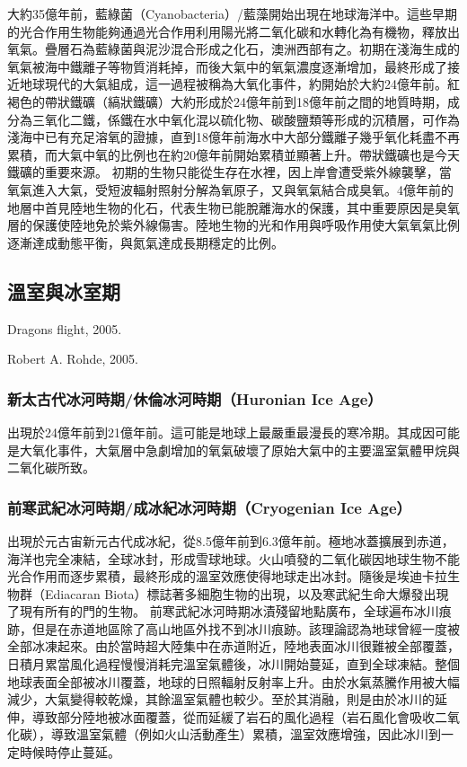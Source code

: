 \documentclass[a4paper,12pt]{report}
\begin{document}
大約35億年前，藍綠菌（Cyanobacteria）/藍藻開始出現在地球海洋中。這些早期的光合作用生物能夠通過光合作用利用陽光將二氧化碳和水轉化為有機物，釋放出氧氣。疊層石為藍綠菌與泥沙混合形成之化石，澳洲西部有之。初期在淺海生成的氧氣被海中鐵離子等物質消耗掉，而後大氣中的氧氣濃度逐漸增加，最終形成了接近地球現代的大氣組成，這一過程被稱為大氧化事件，約開始於大約24億年前。紅褐色的帶狀鐵礦（縞狀鐵礦）大約形成於24億年前到18億年前之間的地質時期，成分為三氧化二鐵，係鐵在水中氧化混以硫化物、碳酸鹽類等形成的沉積層，可作為淺海中已有充足溶氧的證據，直到18億年前海水中大部分鐵離子幾乎氧化耗盡不再累積，而大氣中氧的比例也在約20億年前開始累積並顯著上升。帶狀鐵礦也是今天鐵礦的重要來源。
初期的生物只能從生存在水裡，因上岸會遭受紫外線襲擊，當氧氣進入大氣，受短波輻射照射分解為氧原子，又與氧氣結合成臭氧。4億年前的地層中首見陸地生物的化石，代表生物已能脫離海水的保護，其中重要原因是臭氧層的保護使陸地免於紫外線傷害。陸地生物的光和作用與呼吸作用使大氣氧氣比例逐漸達成動態平衡，與氮氣達成長期穩定的比例。
\subsection{溫室與冰室期}
\bct\bfH\ctr{}\caption{Dragons flight, 2005.}\ef\FB\ect\bct\bfH\ctr{}\caption{Robert A. Rohde, 2005.}\ef\FB\ect
\subsubsection{新太古代冰河時期/休倫冰河時期（Huronian Ice Age）}
出現於24億年前到21億年前。這可能是地球上最嚴重最漫長的寒冷期。其成因可能是大氧化事件，大氣層中急劇增加的氧氣破壞了原始大氣中的主要溫室氣體甲烷與二氧化碳所致。
\subsubsection{前寒武紀冰河時期/成冰紀冰河時期（Cryogenian Ice Age）}
出現於元古宙新元古代成冰紀，從8.5億年前到6.3億年前。極地冰蓋擴展到赤道，海洋也完全凍結，全球冰封，形成雪球地球。火山噴發的二氧化碳因地球生物不能光合作用而逐步累積，最終形成的溫室效應使得地球走出冰封。隨後是埃迪卡拉生物群（Ediacaran Biota）標誌著多細胞生物的出現，以及寒武紀生命大爆發出現了現有所有的門的生物。
前寒武紀冰河時期冰漬殘留地點廣布，全球遍布冰川痕跡，但是在赤道地區除了高山地區外找不到冰川痕跡。該理論認為地球曾經一度被全部冰凍起來。由於當時超大陸集中在赤道附近，陸地表面冰川很難被全部覆蓋，日積月累當風化過程慢慢消耗完溫室氣體後，冰川開始蔓延，直到全球凍結。整個地球表面全部被冰川覆蓋，地球的日照輻射反射率上升。由於水氣蒸騰作用被大幅減少，大氣變得較乾燥，其餘溫室氣體也較少。至於其消融，則是由於冰川的延伸，導致部分陸地被冰面覆蓋，從而延緩了岩石的風化過程（岩石風化會吸收二氧化碳），導致溫室氣體（例如火山活動產生）累積，溫室效應增強，因此冰川到一定時候時停止蔓延。
\end{document}

